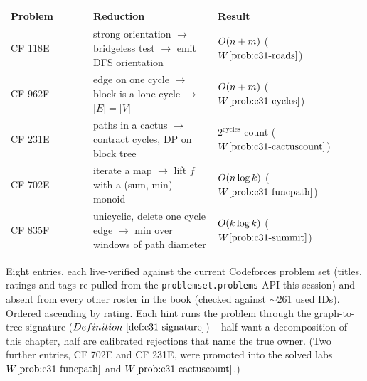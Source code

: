 \begin{center}
\renewcommand{\arraystretch}{1.3}
\setlength{\tabcolsep}{3pt}
\begin{tabular}{@{}p{0.28\linewidth} p{0.44\linewidth} p{0.20\linewidth}@{}}
\toprule
\textbf{Problem} & \textbf{Reduction} & \textbf{Result}\\
\midrule
CF 118E & strong orientation \(\to\) bridgeless test \(\to\) emit DFS orientation & \(O(n+m)\) (\(\probref{c31-roads}\))\\
CF 962F & edge on one cycle \(\to\) block is a lone cycle \(\to\) \(|E|=|V|\) & \(O(n+m)\) (\(\probref{c31-cycles}\))\\
CF 231E & paths in a cactus \(\to\) contract cycles, DP on block tree & \(2^{\text{cycles}}\) count (\(\probref{c31-cactuscount}\))\\
CF 702E & iterate a map \(\to\) lift \(f\) with a (sum, min) monoid & \(O(n\log k)\) (\(\probref{c31-funcpath}\))\\
CF 835F & unicyclic, delete one cycle edge \(\to\) min over windows of path diameter & \(O(k\log k)\) (\(\probref{c31-summit}\))\\
\bottomrule
\end{tabular}
\end{center}


Eight entries, each live-verified against the current Codeforces problem set (titles,
ratings and tags re-pulled from the \texttt{problemset.problems} API this session) and
absent from every other roster in the book (checked against \(\sim\!261\) used IDs).
Ordered ascending by rating.  Each hint runs the problem through the graph-to-tree
signature (\(\defref{c31-signature}\)) -- half want a decomposition of this chapter, half
are calibrated rejections that name the true owner.  (Two further entries, CF 702E and
CF 231E, were promoted into the solved labs \(\probref{c31-funcpath}\) and
\(\probref{c31-cactuscount}\).)

